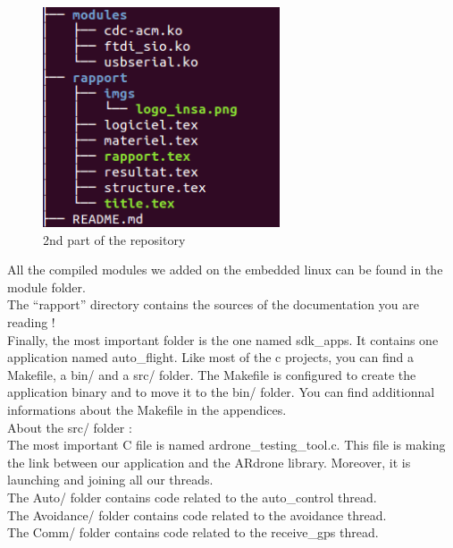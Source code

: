 \begin{figure}[!h] 
\begin{center}
\includegraphics[width=7cm]{imgs/c2.png}
\caption{2nd part of the repository} 
\label{img1} 
\end{center}
\end{figure} 

All the compiled modules we added on the embedded linux can be found in the module folder.\\

The ``rapport'' directory contains the sources of the documentation you are reading !\\

Finally, the most important folder is the one named sdk\_apps. It contains one application named auto\_flight. Like most of the c projects, you can find a Makefile, a bin/ and a src/ folder. The Makefile is configured to create the application binary and to move it to the bin/ folder. You can find additionnal informations about the Makefile in the appendices.\\

About the src/ folder :\\

The most important C file is named ardrone\_testing\_tool.c. This file is making the link between our application and the ARdrone library. Moreover, it is launching and joining all our threads.\\

The Auto/ folder contains code related to the auto\_control thread.\\

The Avoidance/ folder contains code related to the avoidance thread.\\

The Comm/ folder contains code related to the receive\_gps thread.\\

